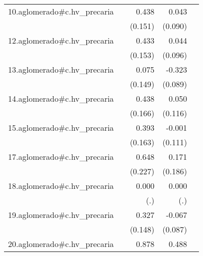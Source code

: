 {\begin{longtable}{l*{4}{D{.}{.}{-1}}}
\addlinespace
10.aglomerado#c.hv\_precaria&                     &       0.438\sym{**} &       0.043         &                     \\
            &                     &     (0.151)         &     (0.090)         &                     \\
\addlinespace
12.aglomerado#c.hv\_precaria&                     &       0.433\sym{**} &       0.044         &                     \\
            &                     &     (0.153)         &     (0.096)         &                     \\
\addlinespace
13.aglomerado#c.hv\_precaria&                     &       0.075         &      -0.323\sym{***}&                     \\
            &                     &     (0.149)         &     (0.089)         &                     \\
\addlinespace
14.aglomerado#c.hv\_precaria&                     &       0.438\sym{**} &       0.050         &                     \\
            &                     &     (0.166)         &     (0.116)         &                     \\
\addlinespace
15.aglomerado#c.hv\_precaria&                     &       0.393\sym{*}  &      -0.001         &                     \\
            &                     &     (0.163)         &     (0.111)         &                     \\
\addlinespace
17.aglomerado#c.hv\_precaria&                     &       0.648\sym{**} &       0.171         &                     \\
            &                     &     (0.227)         &     (0.186)         &                     \\
\addlinespace
18.aglomerado#c.hv\_precaria&                     &       0.000         &       0.000         &                     \\
            &                     &         (.)         &         (.)         &                     \\
\addlinespace
19.aglomerado#c.hv\_precaria&                     &       0.327\sym{*}  &      -0.067         &                     \\
            &                     &     (0.148)         &     (0.087)         &                     \\
\addlinespace
20.aglomerado#c.hv\_precaria&                     &       0.878\sym{***}&       0.488\sym{*}  &                     \\

\end{longtable}}

